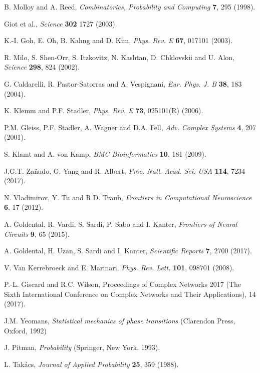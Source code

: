 \documentclass[preprint,pre,superscriptaddress,showpacs]{revtex4}
\begin{document}
\begin{thebibliography}{10}
B. Molloy and A. Reed,
{\it Combinatorics, Probability and Computing} {\bf 7}, 295 (1998).

Giot et al., 
{\it Science} {\bf 302} 1727 (2003).

K.-I. Goh, E. Oh, B. Kahng and D. Kim,
{\it Phys. Rev. E} {\bf 67}, 017101 (2003).

R. Milo, S. Shen-Orr, S. Itzkovitz, N. Kashtan, D. Chklovskii and
U. Alon,
{\it Science} {\bf 298}, 824 (2002).

G. Caldarelli, R. Pastor-Satorras and A. Vespignani,
{\it Eur. Phys. J. B} {\bf 38}, 183 (2004).

K. Klemm and P.F. Stadler, 
{\it Phys. Rev. E} {\bf 73}, 025101(R) (2006).

P.M. Gleiss, P.F. Stadler, A. Wagner and D.A. Fell,
{\it Adv. Complex Systems} {\bf 4}, 207 (2001).

S. Klamt and A. von Kamp,
{\it BMC Bioinformatics} {\bf 10}, 181 (2009).

J.G.T. Za\~nudo, G. Yang and R. Albert,
{\it Proc. Natl. Acad. Sci. USA} {\bf 114}, 7234 (2017).

N. Vladimirov, Y. Tu and R.D. Traub,
{\it Frontiers in Computational Neuroscience}
{\bf 6}, 17 (2012).

A. Goldental, R. Vardi, S. Sardi, P. Sabo and I. Kanter,
{\it Frontiers of Neural Circuits} {\bf 9}, 65 (2015).

A. Goldental, H. Uzan, S. Sardi and I. Kanter,
{\it Scientific Reports} {\bf 7}, 2700 (2017).




V. Van Kerrebroeck and E. Marinari,
{\it Phys. Rev. Lett.} {\bf 101}, 098701 (2008).


P.-L. Giscard and R.C. Wilson,
Proceedings of Complex Networks 2017 (The Sixth International Conference on Complex Networks and Their Applications), 14 (2017).

J.M. Yeomans,
{\it Statistical mechanics of phase transitions}
(Clarendon Press, Oxford, 1992)

J. Pitman, 
{\it Probability} (Springer, New York, 1993).

L. Tak\'acs,
{\it Journal of Applied Probability}
{\bf 25}, 359 (1988).


\end{thebibliography}
\end{document}
